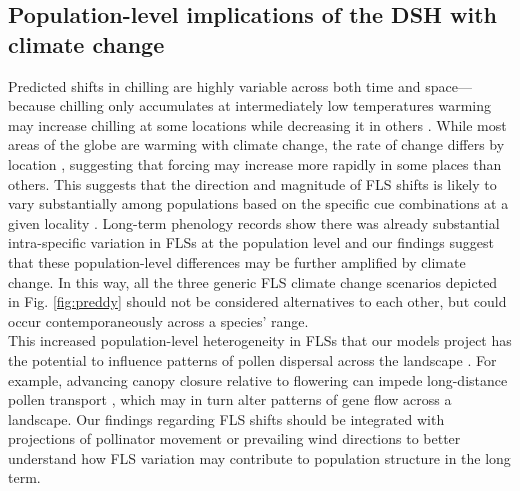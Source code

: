 \documentclass[11pt]{article}\usepackage[]{graphicx}\usepackage[]{color}
\begin{document}
\subsection*{Population-level implications of the DSH with climate change} 

\noindent%
Predicted shifts in chilling are highly variable across both time and space---because chilling only accumulates at intermediately low temperatures warming may increase chilling at some locations while decreasing it in others \citep{Man2017,Zhang:2007aa}. While most areas of the globe are warming with climate change, the rate of change differs by location \citep{Karmalkar:2017aa,Loarie:2009aa}, suggesting that forcing may increase more rapidly in some places than others. This suggests that the direction and magnitude of FLS shifts is likely to vary substantially among populations based on the specific cue combinations at a given locality \citep{Chmielewski:2012aa}. Long-term phenology records show there was already substantial intra-specific variation in FLSs at the population level \citep{Buonaiuto2020} and our findings suggest that these population-level differences may be further amplified by climate change. In this way, all the three generic FLS climate change scenarios depicted in Fig. \ref{fig:preddy} should not be considered alternatives to each other, but could occur contemporaneously across a species' range. \\ %

\noindent This increased population-level heterogeneity in FLSs that our models project has the potential to influence patterns of pollen dispersal across the landscape \citep{Borycka2017,Pace:2018aa}. For example, advancing canopy closure relative to flowering can impede long-distance pollen transport \citep{Milleron2012}, which may in turn alter patterns of gene flow across a landscape. Our findings regarding FLS shifts should be integrated with projections of pollinator movement or prevailing wind directions \citep{Kling:2020aa} to better understand how FLS variation may contribute to population structure in the long term. \\
\end{document}
